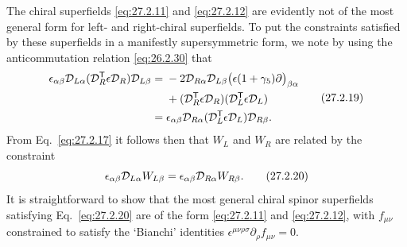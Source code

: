 The chiral superfields \eqref{eq:27.2.11} and \eqref{eq:27.2.12} are
evidently not of the most general form for left- and right-chiral
superfields. To put the constraints satisfied by these superfields in a
manifestly supersymmetric form, we note by using the anticommutation
relation \eqref{eq:26.2.30} that
\begin{equation}
  \begin{aligned}
  \epsilon_{\alpha\beta}\mathcal{D}_{L\alpha}
    (\mathcal{D}_R^{\mathsf T}\epsilon\mathcal{D}_R)\mathcal{D}_{L\beta}
  ={}&-2\mathcal{D}_{R\alpha}\mathcal{D}_{L\beta}
    \bigl(\epsilon(1+\gamma_5)\sl{\partial}\bigr)_{\beta\alpha}
  \\
  &+(\mathcal{D}_R^{\mathsf T}\epsilon\mathcal{D}_R)
    (\mathcal{D}_L^{\mathsf T}\epsilon\mathcal{D}_L)
  \\
  ={}&\epsilon_{\alpha\beta}\mathcal{D}_{R\alpha}
    (\mathcal{D}_L^{\mathsf T}\epsilon\mathcal{D}_L)\mathcal{D}_{R\beta}.
  \end{aligned}
  \tag{27.2.19}\label{eq:27.2.19}
\end{equation}
From Eq.~\eqref{eq:27.2.17} it follows then that \(W_L\) and \(W_R\) are
related by the constraint
\begin{equation}
  \epsilon_{\alpha\beta}\mathcal{D}_{L\alpha}W_{L\beta}
  =\epsilon_{\alpha\beta}\mathcal{D}_{R\alpha}W_{R\beta}.
  \tag{27.2.20}\label{eq:27.2.20}
\end{equation}
It is straightforward to show that the most general chiral spinor
superfields satisfying Eq.~\eqref{eq:27.2.20} are of the form
\eqref{eq:27.2.11} and \eqref{eq:27.2.12}, with \(f_{\mu\nu}\) constrained
to satisfy the `Bianchi' identities
\(\epsilon^{\mu\nu\rho\sigma}\partial_\rho f_{\mu\nu}=0\).
